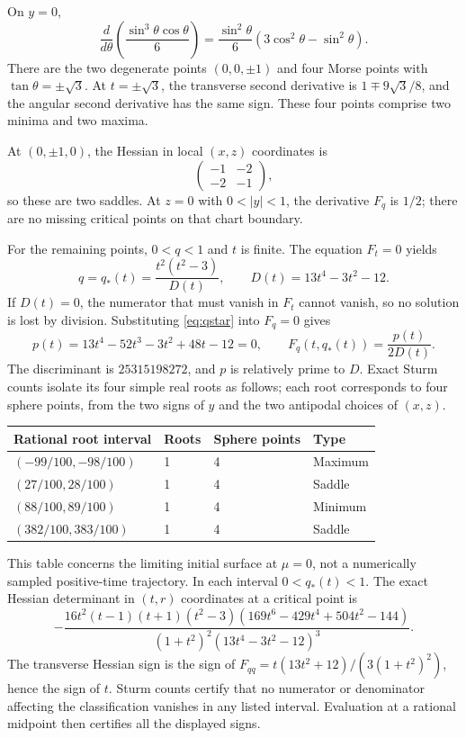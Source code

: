 \documentclass[11pt,a4paper]{article}
\theoremstyle{remark}\newtheorem{remark}[theorem]{Remark}
\begin{document}
On \(y=0\),
\[
 \frac{d}{d\theta}\left(\frac{\sin^3\theta\cos\theta}{6}\right)
 =\frac{\sin^2\theta}{6}(3\cos^2\theta-\sin^2\theta).
\]
There are the two degenerate points \((0,0,\pm1)\) and four Morse points with \(\tan\theta=\pm\sqrt3\). At \(t=\pm\sqrt3\), the transverse second derivative is \(1\mp9\sqrt3/8\), and the angular second derivative has the same sign. These four points comprise two minima and two maxima.

At \((0,\pm1,0)\), the Hessian in local \((x,z)\) coordinates is
\[
 \begin{pmatrix}-1&-2\\-2&-1\end{pmatrix},
\]
so these are two saddles. At \(z=0\) with \(0<|y|<1\), the derivative \(F_q\) is \(1/2\); there are no missing critical points on that chart boundary.

For the remaining points, \(0<q<1\) and \(t\) is finite. The equation \(F_t=0\) yields
\begin{equation}\label{eq:qstar}
 q=q_*(t)=\frac{t^2(t^2-3)}{D(t)},\qquad D(t)=13t^4-3t^2-12.
\end{equation}
If \(D(t)=0\), the numerator that must vanish in \(F_t\) cannot vanish, so no solution is lost by division. Substituting \eqref{eq:qstar} into \(F_q=0\) gives
\begin{equation}\label{eq:quartic}
 p(t)=13t^4-52t^3-3t^2+48t-12=0,
 \qquad F_q(t,q_*(t))=\frac{p(t)}{2D(t)}.
\end{equation}
The discriminant is \(25315198272\), and \(p\) is relatively prime to \(D\). Exact Sturm counts isolate its four simple real roots as follows; each root corresponds to four sphere points, from the two signs of \(y\) and the two antipodal choices of \((x,z)\).
\begin{center}
\begin{tabular}{llll}
\toprule
Rational root interval & Roots & Sphere points & Type\\
\midrule
\((-99/100,-98/100)\)&1&4&Maximum\\
\((27/100,28/100)\)&1&4&Saddle\\
\((88/100,89/100)\)&1&4&Minimum\\
\((382/100,383/100)\)&1&4&Saddle\\
\bottomrule
\end{tabular}
\end{center}
This table concerns the limiting initial surface at $\mu=0$, not a numerically sampled positive-time trajectory.
In each interval \(0<q_*(t)<1\). The exact Hessian determinant in \((t,r)\) coordinates at a critical point is
\begin{equation}\label{eq:hessdet}
 -\frac{16t^2(t-1)(t+1)(t^2-3)
 (169t^6-429t^4+504t^2-144)}
 {(1+t^2)^2(13t^4-3t^2-12)^3}.
\end{equation}
The transverse Hessian sign is the sign of
\(F_{qq}=t(13t^2+12)/(3(1+t^2)^2)\), hence the sign of \(t\). Sturm counts certify that no numerator or denominator affecting the classification vanishes in any listed interval. Evaluation at a rational midpoint then certifies all the displayed signs.
\end{document}
